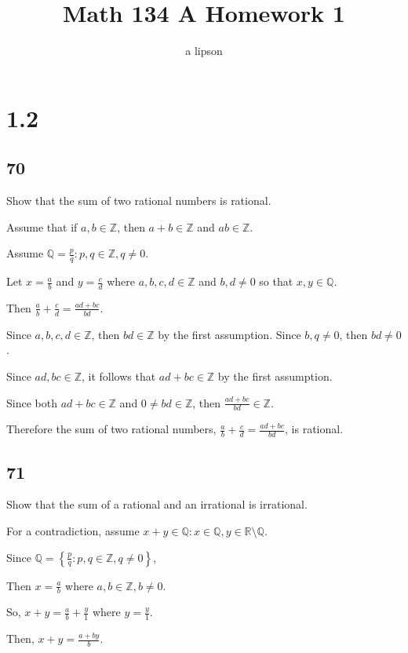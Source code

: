 \documentclass{article}
\title{Math 134 A Homework 1}
\author{a lipson}
\begin{document}
\maketitle

\section*{1.2}

\subsection*{70}
Show that the sum of two rational numbers is rational.

Assume that if $a,b \in \mathbb{Z}$, then $a + b \in \mathbb{Z}$ and $ab \in \mathbb{Z}$.

Assume $\mathbb{Q} = \frac{p}{q} : p,q \in \mathbb{Z}, q \neq 0$.

Let $x = \frac{a}{b}$ and $y = \frac{c}{d}$ where $a,b,c,d \in \mathbb{Z}$ and $b,d \neq 0$ so that $x, y \in \mathbb{Q}$.

Then $\frac{a}{b} + \frac{c}{d} = \frac{ad + bc}{bd}$.

Since $a,b,c,d \in \mathbb{Z}$, then $bd \in \mathbb{Z}$ by the first assumption.
Since $b,q \neq 0$, then $bd \neq 0$.

Since $ad,bc \in \mathbb{Z}$, it follows that $ad + bc \in \mathbb{Z}$ by the first assumption.

Since both $ad + bc \in \mathbb{Z}$ and $0 \neq bd \in \mathbb{Z}$, then $\frac{ad + bc}{bd} \in \mathbb{Z}$.

Therefore the sum of two rational numbers, $\frac{a}{b} + \frac{c}{d} = \frac{ad + bc}{bd}$, is rational.


\subsection*{71}
Show that the sum of a rational and an irrational is irrational.

For a contradiction, assume $x + y \in \mathbb{Q} : x \in \mathbb{Q}, y \in \mathbb{R} \setminus \mathbb{Q}$.

Since $\mathbb{Q} = \left\{ \frac{p}{q} : p,q \in \mathbb{Z}, q \neq 0 \right\}$,

Then $x = \frac{a}{b}$ where $a,b \in \mathbb{Z}, b \neq 0$.

So, $x + y = \frac{a}{b} + \frac{y}{1}$ where $y = \frac{y}{1}$.

Then, $x + y = \frac{a + by}{b}$.
\end{document}
